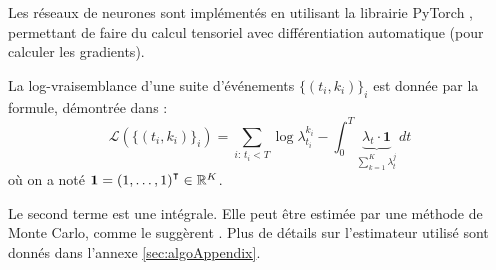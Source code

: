 \documentclass[../main.tex]{subfiles}
\begin{document}
	
Les réseaux de neurones sont implémentés en utilisant la librairie \textsf{PyTorch} \cite{paszke2017automatic}, permettant de faire du calcul tensoriel avec différentiation automatique (pour calculer les gradients).

La log-vraisemblance d'une suite d'événements $\{(t_i,k_i)\}_i$ est donnée par la formule, démontrée dans \autocite{meiEisnerNeuralHawkes}:
\begin{equation}\label{eq:explicitLikelihood}
\mathcal{L}\left(\{(t_i,k_i)\}_i\right)
=
\sum_{i:\,t_i < T} \log\lambda^{k_i}_{t_i} - \int_0^T \underbrace{\lambda_t\cdot\mathbf{1}}_{\sum_{k=1}^K\lambda^j_t}\,dt
\end{equation}
où on a noté $\mathbf{1} = {(1,\ldots,1)}^\intercal\in\mathbb{R}^K$.

Le second terme est une intégrale. Elle peut être estimée par une méthode de Monte Carlo, comme le suggèrent \citeauthor{meiEisnerNeuralHawkes}. Plus de détails sur l'estimateur utilisé sont donnés dans l'annexe \autoref{sec:algoAppendix}.
\end{document}
